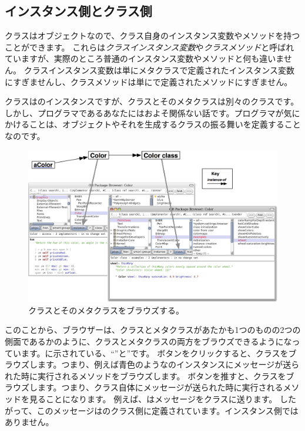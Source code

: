 \documentclass[a4paper,10pt,twoside]{book}
\begin{document}
\subsection{インスタンス側とクラス側}

クラスはオブジェクトなので、クラス自身のインスタンス変数やメソッドを持つことができます。
これらは\emph{クラスインスタンス変数}や\emph{クラスメソッド}と呼ばれていますが、実際のところ普通のインスタンス変数やメソッドと何も違いません。
クラスインスタンス変数は単にメタクラスで定義されたインスタンス変数にすぎませんし、クラスメソッドは単にで定義されたメソッドにすぎません。

クラスはのインスタンスですが、クラスとそのメタクラスは別々のクラスです。
しかし、プログラマであるあなたにはおよそ関係ない話です。プログラマが気にかけることは、オブジェクトやそれを生成するクラスの振る舞いを定義することなのです。

\begin{figure}[htb]
\begin{center}
\includegraphics[width=\textwidth]{Color-Buttons}
\caption{クラスとそのメタクラスをブラウズする。
}
\end{center}
\end{figure}

このことから、ブラウザーは、クラスとメタクラスがあたかも1つのものの2つの側面であるかのように、クラスとメタクラスの両方をブラウズできるようになっています。に示されている、``''と''です。
ボタンをクリックすると、クラスをブラウズします。つまり、例えば青色のようなのインスタンスにメッセージが送られた時に実行されるメソッドをブラウズします。
ボタンを推すと、クラスをブラウズします。つまり、クラス自体にメッセージが送られた時に実行されるメソッドを見ることになります。
例えば、はメッセージをクラスに送ります。
したがって、このメッセージはのクラス側に定義されています。インスタンス側ではありません。
\end{document}
